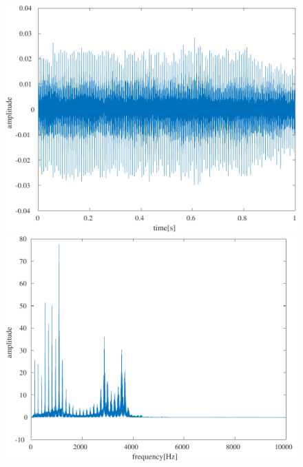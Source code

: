 \begin{figure}[H]
    \centering
    \begin{minipage}{.3\textwidth}
        \centering
        \includegraphics[keepaspectratio,width=\textwidth]{../../Figures/03_30_0a.pdf}
    \end{minipage}
    \begin{minipage}{.3\textwidth}
        \centering
        \includegraphics[keepaspectratio,width=\textwidth]{../../Figures/03_30_afft.pdf}
    \end{minipage}
    \begin{minipage}{.3\textwidth}

\end{minipage}
\end{figure}
